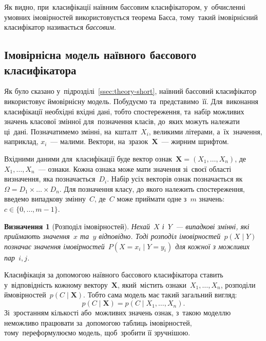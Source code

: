 \documentclass[
	a4paper,
	oneside,
	DIV = 12,
	fontsize = 13pt,
	headings = normal,
	numbers = endperiod,
]{scrartcl}
\theoremstyle{mythm}
\newtheorem{mydef}{Визначення}
\newcommand{\myvec}[1]{\mathbf{#1}}
\begin{document}
			Як видно, при~класифікації наївним баєсовим класифікатором, у~обчисленні умовних імовірностей використовується теорема Баєса, тому~такий імовірнісний класифікатор називається \emph{баєсовим}.

		\subsection{Імовірнісна модель наївного баєсового класифікатора}
			Як було сказано у~підрозділі~\ref{ssec:theory-short}, наївний баєсовий класифікатор використовує ймовірнісну модель. Побудуємо та~представимо~її. Для~виконання класифікації необхідні вхідні дані, тобто спостереження, та~набір можливих значень класової змінної для~позначення класів, до~яких можуть належати ці~дані. Позначатимемо змінні, на~кшталт~$X_i$, великими літерами, а~їх~значення, наприклад, $x_i$~— малими. Вектори, на~зразок~$\myvec{X}$~— жирним шрифтом.
			
			Вхідними даними для~класифікації буде вектор ознак~$\myvec{X} = \left( X_1, \dots, X_n \right)$, де~$X_1, \dots, X_n$~— ознаки. Кожна ознака може мати значення зі~своєї області визначення, яка позначається~$D_i$. Набір усіх векторів ознак позначається як~$\Omega = D_1 \times \dots \times D_n$. Для позначення класу, до якого належить спостереження, введемо випадкову змінну~$C$, де~$C$ може приймати одне з~$m$ значень: $c \in \{ 0, \dots, m - 1\}$. 

			\begin{mydef}[Розподіл імовірностей]
				Нехай~$X$ і~$Y$~— випадкові змінні, які приймають значення~$x$ та~$y$ відповідно. Тоді розподіл імовірностей~$p(X \mid Y)$ позначає значення імовірностей~$P(X = x_i \mid Y = y_i)$ для кожної з можливих пар~$i, j$.~\cite{russel-norvig-ai-ma}
			\end{mydef}

			Класифікація за допомогою наївного баєсового класифікатора ставить у~відповідність кожному вектору~$\myvec{X}$, який~містить ознаки~$X_1, \dots, X_n$, розподіли ймовірностей~$p(C \mid \myvec{X})$. Тобто сама модель має такий загальний вигляд:
			\begin{equation}
				p\left( C \mid \myvec{X} \right) = p\left( C \mid X_1, \dots, X_n \right).
			\end{equation}
			Зі~зростанням кількості або~можливих значень ознак, з~такою моделлю неможливо працювати за~допомогою таблиць імовірностей, тому~переформулюємо модель, щоб~зробити її зручнішою.
\end{document}
